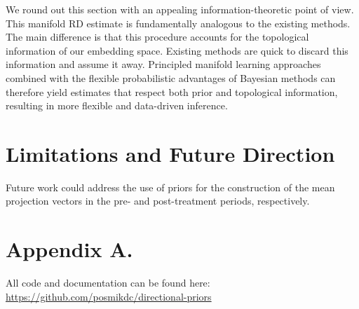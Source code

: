 \documentclass[twoside,11pt]{article}
\begin{document}
We round out this section with an appealing information-theoretic point of view. This manifold RD estimate is fundamentally analogous to the existing methods. The main difference is that this procedure accounts for the topological information of our embedding space. Existing methods are quick to discard this information and assume it away. Principled manifold learning approaches combined with the flexible probabilistic advantages of Bayesian methods can therefore yield estimates that respect both prior and topological information, resulting in more flexible and data-driven inference.

\section{Limitations and Future Direction}

Future work could address the use of priors for the construction of the mean projection vectors in the pre- and post-treatment periods, respectively. 

\newpage

\appendix
\section*{Appendix A.} \label{sc:app_a}
All code and documentation can be found here: \href{https://github.com/posmikdc/directional-priors}{https://github.com/posmikdc/directional-priors}

\newpage 

\end{document}
